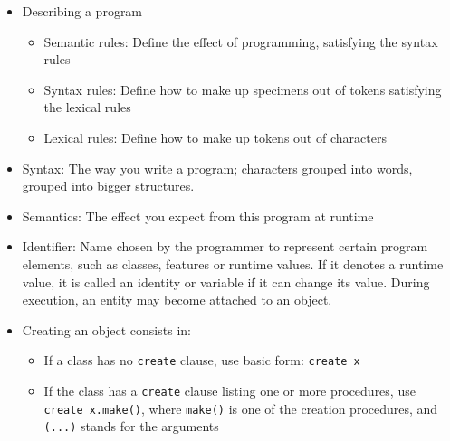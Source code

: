 \documentclass[a4paper]{article}
\newcommand{\inline}[1]{\lstinline!#1!}%
\begin{document}
\begin{itemize}
\item Describing a program
\begin{itemize}
\item Semantic rules: Define the effect of programming, satisfying the syntax rules
\item Syntax rules: Define how to make up specimens out of tokens satisfying the lexical rules
\item Lexical rules: Define how to make up tokens out of characters
\end{itemize}
\item Syntax: The way you write a program; characters grouped into words, grouped into bigger structures. 
\item Semantics: The effect you expect from this program at runtime
\item Identifier: Name chosen by the programmer to represent certain program elements, such as classes, features or runtime values. If it denotes a runtime value, it is called an identity or variable if it can change its value. During execution, an entity may become attached to an object. 
\item Creating an object consists in:
\begin{itemize}
\item If a class has no \inline{create} clause, use basic form: \inline{create x}
\item If the class has a \inline{create} clause listing one or more procedures, use \inline{create x.make()}, where \inline{make()} is one of the creation procedures, and \inline{(...)} stands for the arguments
\end{itemize}
\end{itemize}
\end{document}
